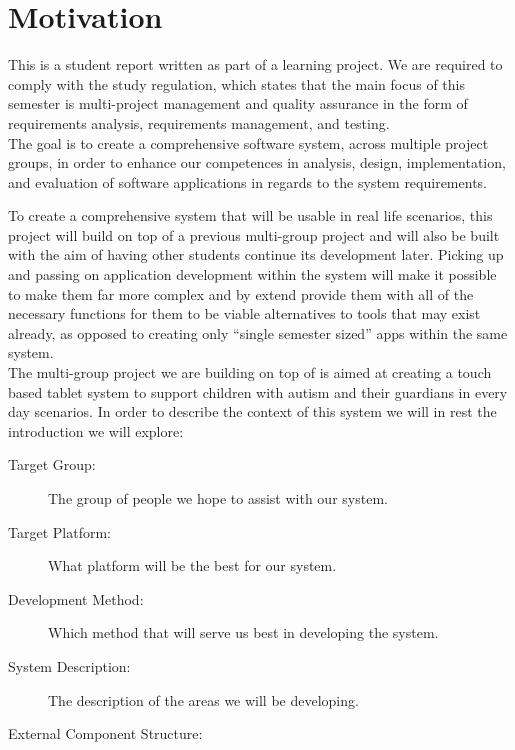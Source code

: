 \section{Motivation}
This is a student report written as part of a learning project.
We are required to comply with the study regulation, which states that the main focus of this semester is multi-project management and quality assurance in the form of requirements analysis, requirements management, and testing.\\
The goal is to create a comprehensive software system, across multiple project groups, in order to enhance our competences in analysis, design, implementation, and evaluation of software applications in regards to the system requirements. \cite{studyreg}

To create a comprehensive system that will be usable in real life scenarios, this project will build on top of a previous multi-group project and will also be built with the aim of having other students continue its development later.
Picking up and passing on application development within the system will make it possible to make them far more complex and by extend provide them with all of the necessary functions for them to be viable alternatives to tools that may exist already, as opposed to creating only ``single semester sized'' apps within the same system.\\
  
The multi-group project we are building on top of is aimed at creating a touch based tablet system to support children with autism and their guardians in every day scenarios.
In order to describe the context of this system we will in rest the introduction we will explore: 
\begin{description}
	\item[Target Group:] The group of people we hope to assist with our system.
	\item[Target Platform:] What platform will be the best for our system.
	\item[Development Method:] Which method that will serve us best in developing the system.
	\item[System Description:] The description of the areas we will be developing.
	\item[External Component Structure:]
\end{description}